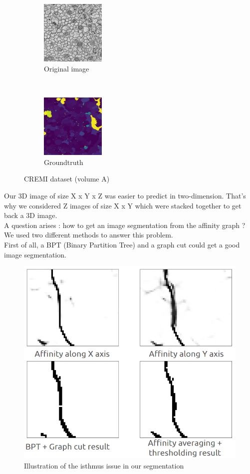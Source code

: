 \begin{figure}[!htbp]
    \centering
    \begin{subfigure}[t]{0.45\textwidth}
        \centering
        \includegraphics[height=1.2in]{./images/cremi_orig_1.png}
        \caption{Original image}
    \end{subfigure}%
    ~ 
    \begin{subfigure}[t]{0.45\textwidth}
        \centering
        \includegraphics[height=1.2in]{./images/cremi_gt_1.png}
        \caption{Groundtruth}
    \end{subfigure}
    \caption{CREMI dataset (volume A)}
\end{figure}

Our 3D image of size X x Y x Z was easier to predict in two-dimension. 
That's why we considered Z images of size X x Y which were stacked together to get back a 3D image.\\


A question arises : how to get an image segmentation from the affinity graph ?\\

We used two different methods to answer this problem.\\
First of all, a BPT (Binary Partition Tree) and a graph cut could get a good image segmentation. 

\begin{figure}[!htbp]
	\centering
	\includegraphics[width=0.8\linewidth]{./images/cremi_isthmus.png}
	\caption{Illustration of the isthmus issue in our segmentation}%
	\label{fig:cremi_isthmus}
\end{figure}

